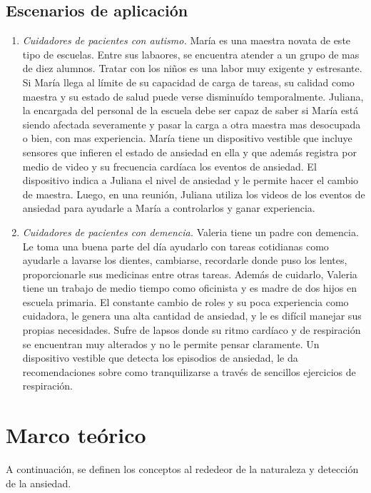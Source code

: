 \documentclass[letterpaper,12pt]{cicese}
\begin{document}
			\section{Escenarios de aplicaci\'on}
				\begin{enumerate}
					\item \emph{Cuidadores de pacientes con autismo.}
				Mar\'ia es una maestra novata de este tipo de escuelas. Entre sus labaores, se encuentra
					atender a un grupo de mas de diez alumnos. Tratar con los ni\~nos es una labor muy exigente y estresante. Si Mar\'ia llega al l\'imite de su capacidad
					de carga de tareas, su calidad como maestra y su estado de salud puede verse disminu\'ido temporalmente. Juliana, la encargada del personal de la
					escuela debe ser capaz de saber si Mar\'ia est\'a siendo afectada severamente y pasar la carga a otra maestra mas desocupada o bien, con mas experiencia. Mar\'ia
					tiene un dispositivo vestible que incluye sensores que infieren el estado de ansiedad en ella y que adem\'as registra por medio de video y su
					frecuencia card\'iaca los eventos de ansiedad. El dispositivo indica a Juliana el nivel de ansiedad y le permite hacer el cambio de maestra. Luego,
					en una reuni\'on, Juliana utiliza los videos de los eventos de ansiedad para ayudarle a Mar\'ia a controlarlos y ganar experiencia.
					\item \emph{Cuidadores de pacientes con demencia.}
						Valeria tiene un padre con demencia. Le toma una buena parte del d\'ia ayudarlo
						con tareas cotidianas como ayudarle a lavarse los dientes, cambiarse, recordarle donde puso los lentes, proporcionarle sus medicinas entre
						otras tareas. Adem\'as de cuidarlo, Valeria tiene un trabajo de medio tiempo como oficinista y es madre de dos hijos en escuela primaria.
						El constante cambio de roles y su poca experiencia como cuidadora, le genera una alta cantidad de ansiedad, y le es dif\'icil manejar sus
						propias necesidades. Sufre de lapsos donde su ritmo card\'iaco y de respiraci\'on se encuentran muy alterados y no le permite pensar
						claramente. Un dispositivo vestible que detecta los episodios de ansiedad, le da recomendaciones sobre como tranquilizarse a trav\'es de
						sencillos ejercicios de respiraci\'on.
				\end{enumerate}

		\chapter{Marco te\'orico} 
			A continuaci\'on, se definen los conceptos al rededeor de la naturaleza y detecci\'on de la ansiedad.
				
\end{document}
